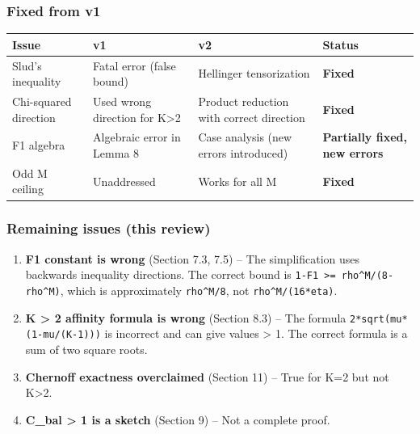 \documentclass[
  12pt,
]{article}
\begin{document}
\subsubsection{Fixed from v1}\label{fixed-from-v1}

\begin{longtable}[]{@{}
  >{\raggedright\arraybackslash}p{}
  >{\raggedright\arraybackslash}p{}
  >{\raggedright\arraybackslash}p{}
  >{\raggedright\arraybackslash}p{}@{}}
\toprule\noalign{}
\begin{minipage}[b]{\linewidth}\raggedright
Issue
\end{minipage} & \begin{minipage}[b]{\linewidth}\raggedright
v1
\end{minipage} & \begin{minipage}[b]{\linewidth}\raggedright
v2
\end{minipage} & \begin{minipage}[b]{\linewidth}\raggedright
Status
\end{minipage} \\
\midrule\noalign{}
\endhead
\bottomrule\noalign{}
\endlastfoot
Slud's inequality & Fatal error (false bound) & Hellinger tensorization
& \textbf{Fixed} \\
Chi-squared direction & Used wrong direction for K\textgreater2 &
Product reduction with correct direction & \textbf{Fixed} \\
F1 algebra & Algebraic error in Lemma 8 & Case analysis (new errors
introduced) & \textbf{Partially fixed, new errors} \\
Odd M ceiling & Unaddressed & Works for all M & \textbf{Fixed} \\
\end{longtable}

\subsubsection{Remaining issues (this
review)}\label{remaining-issues-this-review}

\begin{enumerate}
\def\labelenumi{\arabic{enumi}.}
\item
  \textbf{F1 constant is wrong} (Section 7.3, 7.5) -- The simplification
  uses backwards inequality directions. The correct bound is
  \texttt{1-F1\ \textgreater{}=\ rho\^{}M/(8-rho\^{}M)}, which is
  approximately \texttt{rho\^{}M/8}, not \texttt{rho\^{}M/(16*eta)}.
\item
  \textbf{K \textgreater{} 2 affinity formula is wrong} (Section 8.3) --
  The formula \texttt{2*sqrt(mu*(1-mu/(K-1)))} is incorrect and can give
  values \textgreater{} 1. The correct formula is a sum of two square
  roots.
\item
  \textbf{Chernoff exactness overclaimed} (Section 11) -- True for K=2
  but not K\textgreater2.
\item
  \textbf{C\_bal \textgreater{} 1 is a sketch} (Section 9) -- Not a
  complete proof.
\end{enumerate}
\end{document}
